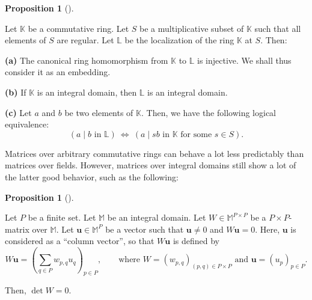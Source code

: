 \documentclass[numbers=enddot,12pt,final,onecolumn,notitlepage]{scrartcl}%
\theoremstyle{definition}
\newtheorem{prop}[theo]{Proposition}
\newenvironment{proposition}[1][]
{\begin{prop}[#1]\begin{leftbar}}
{\end{leftbar}\end{prop}}
\let\sumnonlimits\sum
\renewcommand{\sum}{\sumnonlimits\limits}
\begin{document}
\begin{proposition}
\label{prop.locali.div}Let $\mathbb{K}$ be a commutative ring. Let $S$ be a
multiplicative subset of $\mathbb{K}$ such that all elements of $S$ are
regular. Let $\mathbb{L}$ be the localization of the ring $\mathbb{K}$ at $S$. Then:

\textbf{(a)} The canonical ring homomorphism from $\mathbb{K}$ to $\mathbb{L}$
is injective. We shall thus consider it as an embedding.

\textbf{(b)} If $\mathbb{K}$ is an integral domain, then $\mathbb{L}$ is an
integral domain.

\textbf{(c)} Let $a$ and $b$ be two elements of $\mathbb{K}$. Then, we have
the following logical equivalence:%
\[
\left(  a\mid b\text{ in }\mathbb{L}\right)  \ \Longleftrightarrow\ \left(
a\mid sb\text{ in }\mathbb{K}\text{ for some }s\in S\right)  .
\]

\end{proposition}

Matrices over arbitrary commutative rings can behave a lot less predictably
than matrices over fields. However, matrices over integral domains still show
a lot of the latter good behavior, such as the following:

\begin{proposition}
\label{prop.intdom.ker-mat}Let $P$ be a finite set. Let $\mathbb{M}$ be an
integral domain. Let $W\in\mathbb{M}^{P\times P}$ be a $P\times P$-matrix over
$\mathbb{M}$. Let $\mathbf{u}\in\mathbb{M}^{P}$ be a vector such that
$\mathbf{u}\neq0$ and $W\mathbf{u}=0$. Here, $\mathbf{u}$ is considered as a
\textquotedblleft column vector\textquotedblright, so that $W\mathbf{u}$ is
defined by
\[
W\mathbf{u}=\left(  \sum_{q\in P}w_{p,q}u_{q}\right)  _{p\in P},\qquad
\text{where }W=\left(  w_{p,q}\right)  _{\left(  p,q\right)  \in P\times
P}\text{ and }\mathbf{u}=\left(  u_{p}\right)  _{p\in P}.
\]


Then, $\det W=0$.
\end{proposition}
\end{document}
